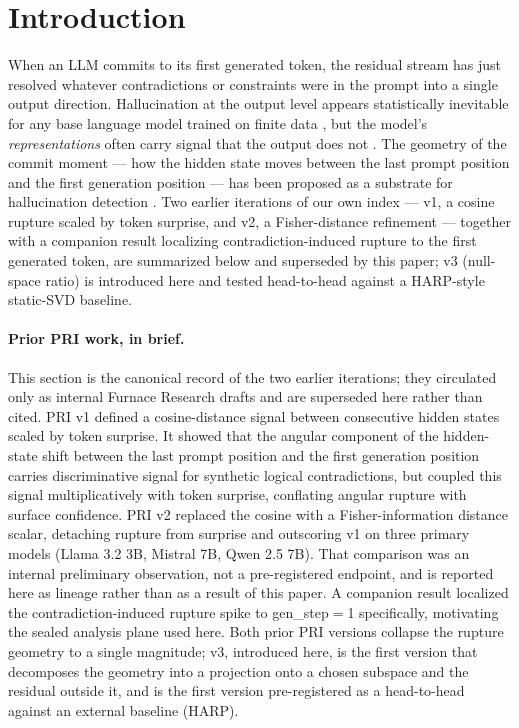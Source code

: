 \documentclass[10pt, letterpaper]{article}
\begin{document}
\section{Introduction}
\label{sec:intro}

When an LLM commits to its first generated token, the residual stream
has just resolved whatever contradictions or constraints were in the
prompt into a single output direction. Hallucination at the output
level appears statistically inevitable for any base language model
trained on finite data \citep{kalai2025why}, but the model's
\emph{representations} often carry signal that the output does not
\citep{agrawal2024hallucinated, farquhar2024semantic}. The geometry of
the commit moment --- how the hidden state moves between the last
prompt position and the first generation position --- has been
proposed as a substrate for hallucination detection
\citep{hu2025harp}. Two earlier iterations of our own index --- v1, a
cosine rupture scaled by token surprise, and v2, a Fisher-distance
refinement --- together with a companion result localizing
contradiction-induced rupture to the first generated token, are
summarized below and superseded by this paper; v3 (null-space ratio)
is introduced here and tested head-to-head against a HARP-style
static-SVD baseline.

\paragraph{Prior PRI work, in brief.} This section is the canonical
record of the two earlier iterations; they circulated only as internal
Furnace Research drafts and are superseded here rather than cited.
PRI v1 defined a cosine-distance signal between consecutive hidden
states scaled by token surprise. It showed that the angular component
of the hidden-state shift between the last prompt position and the
first generation position carries discriminative signal for
synthetic logical contradictions, but coupled this signal
multiplicatively with token surprise, conflating angular rupture
with surface confidence. PRI v2 replaced the
cosine with a Fisher-information distance scalar, detaching rupture
from surprise and outscoring v1 on three primary models (Llama 3.2 3B,
Mistral 7B, Qwen 2.5 7B). That comparison was an internal preliminary
observation, not a pre-registered endpoint, and is reported here as
lineage rather than as a result of this paper. A companion result
localized the contradiction-induced
rupture spike to gen\_step$=$1 specifically, motivating the sealed
analysis plane used here. Both prior PRI versions collapse the
rupture geometry to a single magnitude; v3, introduced here, is the
first version that decomposes the geometry into a projection onto a
chosen subspace and the residual outside it, and is the first
version pre-registered as a head-to-head against an external
baseline (HARP).
\end{document}
